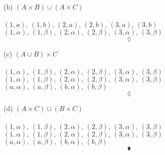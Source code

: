 (b) $(A\times B)\cup(A\times C)$\\\\
$(1,a),\,(1,b),\,(2,a),\,(2,b),\,(3,a),\,(3,b)$\\ 
$(1,\alpha),\,(1,\beta),\,(2,\alpha),\,(2,\beta),\,(3,\alpha),\,(3,\beta)$ 
$$\lozenge$$

(c) $(A\cup B)\times C$\\\\
$(1,\alpha),\,(1,\beta),\,(2,\alpha),\,(2,\beta),\,(3,\alpha),\,(3,\beta)$ 
$(1,\alpha),\,(1,\beta),\,(2,\alpha),\,(2,\beta),\,(3,\alpha),\,(3,\beta)$ \\
$(a,\alpha),\,(a,\beta),\,(b,\alpha),\,(b,\beta)$ 
$$\lozenge$$

(d) $(A\times C)\cup(B\times C)$\\\\
$(1,\alpha),\,(1,\beta),\,(2,\alpha),\,(2,\beta),\,(3,\alpha),\,(3,\beta)$ 
$(1,\alpha),\,(1,\beta),\,(2,\alpha),\,(2,\beta),\,(3,\alpha),\,(3,\beta)$ \\
$(a,\alpha),\,(a,\beta),\,(b,\alpha),\,(b,\beta)$ 
$$\blacklozenge$$
\newpage
